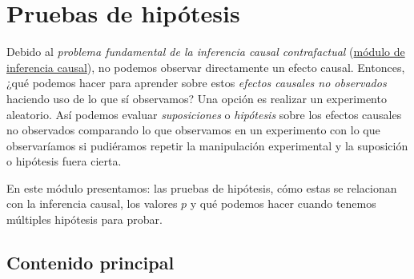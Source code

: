 \documentclass[
  12pt,
  spanish,
]{book}
\begin{document}
\hypertarget{pruebas-de-hipuxf3tesis}{%
\chapter{Pruebas de hipótesis}\label{pruebas-de-hipuxf3tesis}}

Debido al \emph{problema fundamental de la inferencia causal contrafactual} (\href{inferencia-causal.html}{módulo de inferencia causal}), no podemos observar directamente un efecto causal. Entonces, ¿qué podemos hacer para aprender sobre estos \emph{efectos causales no observados} haciendo uso de lo que sí observamos? Una opción es realizar un experimento aleatorio. Así podemos evaluar \emph{suposiciones} o \emph{hipótesis} sobre los efectos causales no observados comparando lo que observamos en un experimento con lo que observaríamos si pudiéramos repetir la manipulación experimental y la suposición o hipótesis fuera cierta.

En este módulo presentamos: las pruebas de hipótesis, cómo estas se relacionan con la inferencia causal, los valores \(p\) y qué podemos hacer cuando tenemos múltiples hipótesis para probar.

\hypertarget{contenido-principal-3}{%
\section{Contenido principal}\label{contenido-principal-3}}
\end{document}
